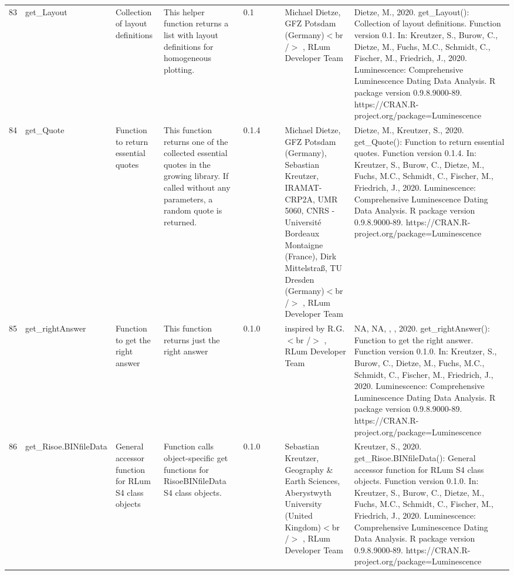 \begin{table}[ht]
\begin{tabular}{rllllllll}
 \\ 
  83 & get\_Layout & Collection of layout definitions & This helper function returns a list with layout definitions for homogeneous plotting. & 0.1
 &  &  & Michael Dietze, GFZ Potsdam (Germany)$<$br /$>$ , RLum Developer Team & Dietze, M., 2020. get\_Layout(): Collection of layout definitions. Function version 0.1. In: Kreutzer, S., Burow, C., Dietze, M., Fuchs, M.C., Schmidt, C., Fischer, M., Friedrich, J., 2020. Luminescence: Comprehensive Luminescence Dating Data Analysis. R package version 0.9.8.9000-89. https://CRAN.R-project.org/package=Luminescence
 \\ 
  84 & get\_Quote & Function to return essential quotes & This function returns one of the collected essential quotes in the growing library. If called without any parameters, a random quote is returned. & 0.1.4
 &  &  & Michael Dietze, GFZ Potsdam (Germany), Sebastian Kreutzer, IRAMAT-CRP2A, UMR 5060, CNRS - Université Bordeaux Montaigne (France), Dirk Mittelstraß, TU Dresden (Germany)$<$br /$>$ , RLum Developer Team & Dietze, M., Kreutzer, S., 2020. get\_Quote(): Function to return essential quotes. Function version 0.1.4. In: Kreutzer, S., Burow, C., Dietze, M., Fuchs, M.C., Schmidt, C., Fischer, M., Friedrich, J., 2020. Luminescence: Comprehensive Luminescence Dating Data Analysis. R package version 0.9.8.9000-89. https://CRAN.R-project.org/package=Luminescence
 \\ 
  85 & get\_rightAnswer & Function to get the right answer & This function returns just the right answer & 0.1.0
 &  &  & inspired by R.G.$<$br /$>$ , RLum Developer Team & NA, NA, , , 2020. get\_rightAnswer(): Function to get the right answer. Function version 0.1.0. In: Kreutzer, S., Burow, C., Dietze, M., Fuchs, M.C., Schmidt, C., Fischer, M., Friedrich, J., 2020. Luminescence: Comprehensive Luminescence Dating Data Analysis. R package version 0.9.8.9000-89. https://CRAN.R-project.org/package=Luminescence
 \\ 
  86 & get\_Risoe.BINfileData & General accessor function for RLum S4 class objects & Function calls object-specific get functions for RisoeBINfileData S4 class objects. & 0.1.0
 &  &  & Sebastian Kreutzer, Geography \& Earth Sciences, Aberystwyth University (United Kingdom)$<$br /$>$ , RLum Developer Team & Kreutzer, S., 2020. get\_Risoe.BINfileData(): General accessor function for RLum S4 class objects. Function version 0.1.0. In: Kreutzer, S., Burow, C., Dietze, M., Fuchs, M.C., Schmidt, C., Fischer, M., Friedrich, J., 2020. Luminescence: Comprehensive Luminescence Dating Data Analysis. R package version 0.9.8.9000-89. https://CRAN.R-project.org/package=Luminescence

\end{tabular}
\end{table}
